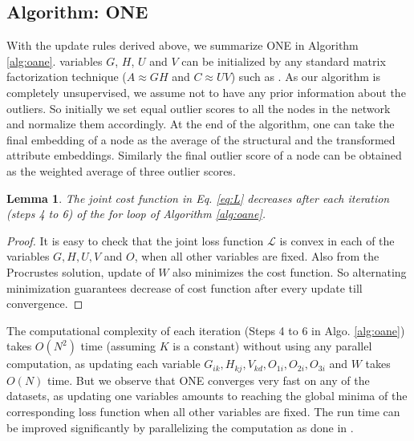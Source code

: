 \documentclass[letterpaper]{article} %
\newtheorem{proof}{Proof}
\newtheorem{lemma}{Lemma}
\begin{document}
\subsection{Algorithm: ONE}\label{sec:algOne}
With the update rules derived above, we summarize ONE in Algorithm \ref{alg:oane}. variables $G$, $H$, $U$ and $V$ can be initialized by any standard matrix factorization technique ($A \approx GH$ and $C \approx UV$) such as \cite{lee2001algorithms}. As our algorithm is completely unsupervised, we assume not to have any prior information about the outliers. So initially we set equal outlier scores to all the nodes in the network and normalize them accordingly. At the end of the algorithm, one can take the final embedding of a node as the average of the structural and the transformed attribute embeddings. Similarly the final outlier score of a node can be obtained as the weighted average of three outlier scores.

\begin{lemma}
The joint cost function in Eq. \ref{eq:L} decreases after each iteration (steps 4 to 6) of the for loop of Algorithm \ref{alg:oane}.
\end{lemma}
\begin{proof}
It is easy to check that the joint loss function $\mathcal{L}$ is convex in each of the variables $G,H,U,V$ and $O$, when all other variables are fixed. Also from the Procrustes solution, update of $W$ also minimizes the cost function. So alternating minimization guarantees decrease of cost function after every update till convergence.
\end{proof}

The computational complexity of each iteration (Steps 4 to 6 in Algo. \ref{alg:oane}) takes $O(N^2)$ time (assuming $K$ is a constant) without using any parallel computation, as updating each variable $G_{ik}, H_{kj}, V_{kd}, O_{1i}, O_{2i}, O_{3i}$ and $W$ takes $O(N)$ time. But we observe that ONE converges very fast on any of the datasets, as updating one variables amounts to reaching the global minima of the corresponding loss function when all other variables are fixed. The run time can be improved significantly by parallelizing the computation as done in \cite{huang2017accelerated}.
\end{document}
